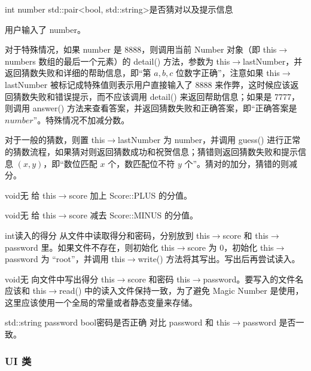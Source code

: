 
{int number}
{std::pair<bool, std::string>}{是否猜对以及提示信息}
{用户输入了 number。

对于特殊情况，如果 number 是 8888，则调用当前 Number 对象（即 this$\to$numbers 数组的最后一个元素）的 detail() 方法，参数为 this$\to$lastNumber，并返回猜数失败和详细的帮助信息，即“第 $a,b,c$ 位数字正确”，注意如果 this$\to$lastNumber 被标记成特殊值则表示用户直接输入了 8888 来作弊，这时候应该返回猜数失败和错误提示，而不应该调用 detail() 来返回帮助信息；如果是 7777，则调用 answer() 方法来查看答案，并返回猜数失败和正确答案，即“正确答案是 $number$”。特殊情况不加减分数。

对于一般的猜数，则置 this$\to$lastNumber 为 number，并调用 guess() 进行正常的猜数流程，如果猜对则返回猜数成功和祝贺信息；猜错则返回猜数失败和提示信息 $(x,y)$，即“数位匹配 $x$ 个，数匹配位不符 $y$ 个”。猜对的加分，猜错的则减分。}

{}
{void}{无}
{给 this$\to$score 加上 Score::PLUS 的分值。}

{}
{void}{无}
{给 this$\to$score 减去 Score::MINUS 的分值。}

{}
{int}{读入的得分}
{从文件中读取得分和密码，分别放到 this$\to$score 和 this$\to$password 里。如果文件不存在，则初始化 this$\to$score 为 0，初始化 this$\to$password 为 “root”，并调用 this$\to$write() 方法将其写出。写出后再尝试读入。}

{}
{void}{无}
{向文件中写出得分 this$\to$score 和密码 this$\to$password。要写入的文件名应该和 this$\to$read() 中的读入文件保持一致，为了避免 Magic Number 是使用，这里应该使用一个全局的常量或者静态变量来存储。}

{std::string password}
{bool}{密码是否正确}
{对比 password 和 this$\to$password 是否一致。}

\subsubsection{UI 类}


